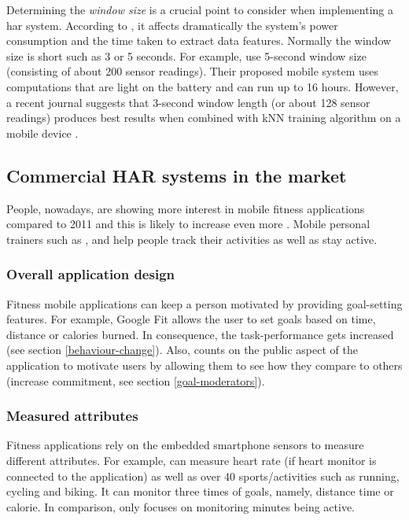         Determining the \textit{window size} is a crucial point to consider when implementing a \gls{har} system. According to \citet[2]{torreshuitzil2015}, it affects dramatically the system’s power consumption and the time taken to extract data features. Normally the window size is short such as 3 or 5 seconds. For example, \citet[3]{torreshuitzil2015} use 5-second window size (consisting of about 200 sensor readings). Their proposed mobile system uses computations that are light on the battery and can run up to 16 hours. However, a recent journal suggests that 3-second window length (or about 128 sensor readings) produces best results when combined with kNN training algorithm on a mobile device \citep[126-136]{bashir2016}. 
        
    \subsection{Commercial HAR systems in the market}
    \label{section:commercial-har-systems}
    People, nowadays, are showing more interest in mobile fitness applications compared to 2011 and this is likely to increase even more \citep{googletrends}. Mobile personal trainers such as \citet[]{endomondo2017}, \citet[]{fitnesskeeper2017} and \citet[]{human2017}  help people track their activities as well as stay active.
    
        \subsubsection{Overall application design}
        Fitness mobile applications can keep a person motivated by providing goal-setting features. For example, Google Fit \citep{googleinc2017} allows the user to set goals based on time, distance or calories burned. In consequence, the task-performance gets increased (see section \ref{behaviour-change}). Also, \citet[]{human2017} counts on the public aspect of the application to motivate users by allowing them to see how they compare to others (increase commitment, see section \ref{goal-moderators}).
        
        \subsubsection{Measured attributes}
        Fitness applications rely on the embedded smartphone sensors to measure different attributes. For example, \citet[]{endomondo2017} can measure heart rate (if heart monitor is connected to the application) as well as over 40 sports/activities such as running, cycling and biking. It can monitor three times of goals, namely, distance time or calorie. In comparison, \citet[]{human2017} only focuses on monitoring minutes being active.
        
